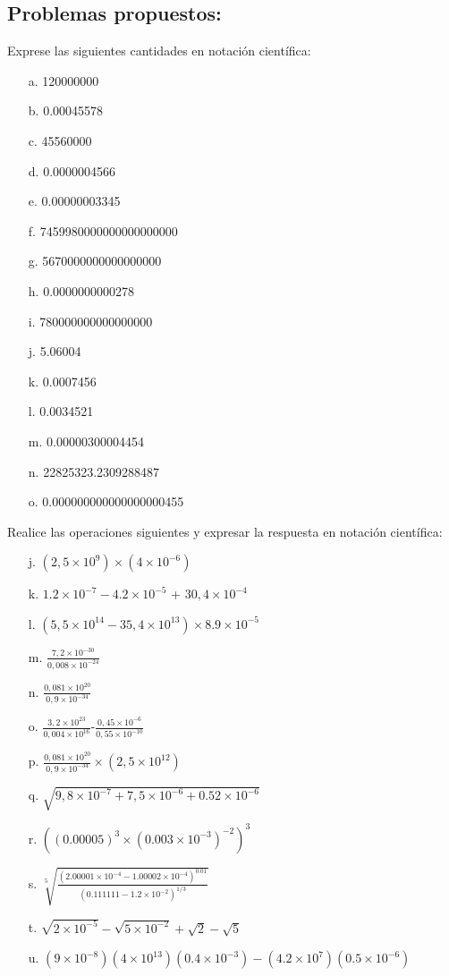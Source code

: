 \documentclass[a5paper,pagesize,10pt,bibtotoc,pointlessnumbers,
normalheadings,DIV=9,fleqn,x11names,table,twoside=false]{scrbook}
\begin{document}
\subsection{Problemas propuestos:}

Exprese las siguientes cantidades en notación científica:

\begin{itemize}
 \item[a.] 120000000
 \item[b.] 0.00045578
 \item[c.] 45560000
 \item[d.] 0.0000004566
 \item[e.] 0.00000003345
 \item[f.] 7459980000000000000000
 \item[g.] 5670000000000000000
 \item[h.] 0.0000000000278
 \item[i.] 780000000000000000
 \item[j.] 5.06004 
 \item[k.] 0.0007456
 \item[l.] 0.0034521
 \item[m.] 0.00000300004454
 \item[n.] 22825323.2309288487
 \item[o.] 0.000000000000000000455
\end{itemize}

Realice las operaciones siguientes y expresar la respuesta en notación científica:

\begin{itemize}
 \item[j.] $(2,5\times10^{9})\times(4\times10^{-6})$
 \item[k.] $1.2\times10^{-7}-4.2\times10^{-5}$ + $30,4\times10^{-4}$
 \item[l.] $(5,5\times10^{14}-35,4\times10^{13})\times 8.9\times10^{-5}$
 \item[m.] $\frac{7,2\times10^{-30}}{0,008\times10^{-24}}$
 \item[n.] $\frac{0,081\times10^{20}}{0,9\times10^{-34}}$
\item[o.]  $\frac{3,2\times10^{23}}{0,004\times10^{16}}$-$\frac{0,45\times10^{-6}}{0,55\times10^{-10}}$
\item[p.] $\frac{0,081\times10^{20}}{0,9\times10^{-34}}\times(2,5\times10^{12})$
\item[q.] $\sqrt{9,8\times10^{-7}+7,5\times10^{-6}+0.52\times 10^{-6}}$
\item[r.] $((0.00005)^3\times (0.003\times 10^{-3})^{-2})^3$
\item[s.] $\sqrt[5]{\frac{(2.00001\times 10^{-4} - 1.00002\times 10^{-4})^{0.01}}{(0.111111-1.2\times 10^{-2})^{1/3}}}$
\item[t.] $\sqrt{2\times 10^{-5}}-\sqrt{5\times 10^{-2}} + \sqrt{2} - \sqrt{5}$
\item[u.] $ (9\times10^{-8})(4\times 10^{13})(0.4\times10^{-3})-(4.2\times 10^7)(0.5\times10^{-6})$
\end{itemize}
\end{document}
